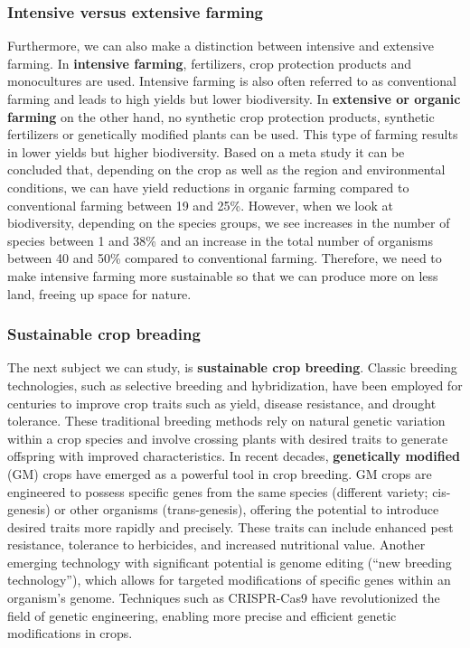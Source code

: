 \documentclass[../summary.tex]{subfiles}
\begin{document}
	\subsubsection{Intensive versus extensive farming}
	
	Furthermore, we can also make a distinction between intensive and extensive farming. In \textbf{intensive farming}, fertilizers, crop protection products and monocultures are used. Intensive farming is also often referred to as conventional farming and leads to high yields but lower biodiversity. In \textbf{extensive or organic farming} on the other hand, no synthetic crop protection products, synthetic fertilizers or genetically modified plants can be used. This type of farming results in lower yields but higher biodiversity. Based on a meta study it can be concluded that, depending on the crop as well as the region and environmental conditions, we can have yield reductions in organic farming compared to conventional farming between 19 and 25\%. However, when we look at biodiversity, depending on the species groups, we see increases in the number of species between 1 and 38\% and an increase in the total number of organisms between 40 and 50\% compared to conventional farming. Therefore, we need to make intensive farming more sustainable so that we can produce more on less land, freeing up space for nature.
	
	\newpage
	\subsubsection{Sustainable crop breading}
	
	The next subject we can study, is \textbf{sustainable crop breeding}. Classic breeding technologies, such as selective breeding and hybridization, have been employed for centuries to improve crop traits such as yield, disease resistance, and drought tolerance. These traditional breeding methods rely on natural genetic variation within a crop species and involve crossing plants with desired traits to generate offspring with improved characteristics. In recent decades, \textbf{genetically modified} (GM) crops have emerged as a powerful tool in crop breeding. GM crops are engineered to possess specific genes from the same species (different variety; cis-genesis) or other organisms (trans-genesis), offering the potential to introduce desired traits more rapidly and precisely. These traits can include enhanced pest resistance, tolerance to herbicides, and increased nutritional value. Another emerging technology with significant potential is genome editing (“new breeding technology”), which allows for targeted modifications of specific genes within an organism's genome. Techniques such as CRISPR-Cas9 have revolutionized the field of genetic engineering, enabling more precise and efficient genetic modifications in crops. 
	
\end{document}
